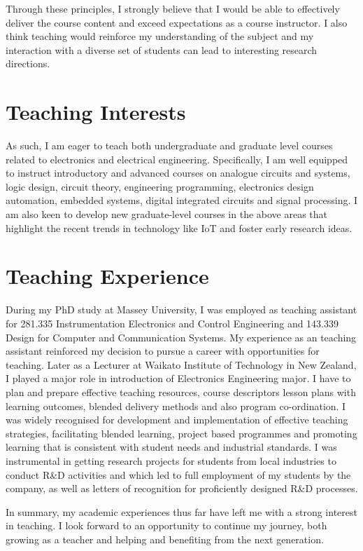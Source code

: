 \documentclass[12pt,a4paper,sans]{moderncv} %
\begin{document}
Through these principles, I strongly believe that I would be able to effectively deliver the course content and
exceed expectations as a course instructor. I also think teaching would reinforce my understanding of the
subject and my interaction with a diverse set of students can lead to interesting research directions.
\section{Teaching Interests}
As such, I am eager to teach both undergraduate and graduate level courses related
to electronics and electrical engineering. Specifically, I am well equipped to instruct introductory and advanced
courses on analogue circuits and systems, logic design, circuit theory, engineering programming, electronics design automation, embedded systems, digital integrated circuits and signal processing. I am also keen to develop new graduate-level courses in the above areas that highlight the recent trends in technology like IoT and foster early research ideas. 

\section{Teaching Experience}
During my PhD study at Massey University, I was  employed as teaching assistant for 281.335 Instrumentation Electronics and Control Engineering and 143.339 Design for Computer and Communication Systems. My experience as an teaching assistant reinforced my decision to pursue a career with opportunities for teaching.  Later as a Lecturer at Waikato Institute of Technology in New Zealand, I played a major role in introduction of Electronics Engineering major. I have to plan and prepare effective teaching resources, course descriptors lesson plans with learning outcomes, blended delivery methods and also program co-ordination. I was widely recognised for development and implementation of effective teaching strategies, facilitating blended learning, project based programmes and promoting learning that is consistent with student needs and industrial standards. I was instrumental in getting research projects for students from local industries to conduct R&D activities and which led to full employment of my students by the company, as well as letters of recognition for proficiently designed R&D processes. 

In summary, my academic experiences thus far have left me with a strong interest in teaching. I look
forward to an opportunity to continue my journey, both growing as a teacher and helping and benefiting
from the next generation.
\end{document}
